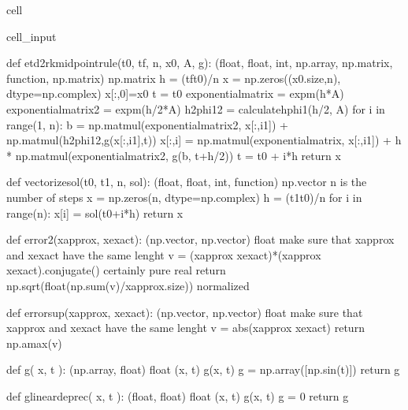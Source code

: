 \documentclass[letterpaper,10pt,english]{jupyterBook}
\begin{document}
\begin{sphinxuseclass}{cell}
\begin{sphinxVerbatimInput}
\begin{sphinxuseclass}{cell_input}
\begin{sphinxVerbatim}[commandchars=\\\{\}]
def etd2rk\PYGZus{}midpoint\PYGZus{}rule(t0, tf, n, x0, A, g):
    \PYGZsq{}\PYGZsq{}\PYGZsq{}(float, float, int, np.array, np.matrix, function, np.matrix) \PYGZhy{}\PYGZgt{} np.matrix\PYGZsq{}\PYGZsq{}\PYGZsq{}
    h = (tf\PYGZhy{}t0)/n
    x = np.zeros((x0.size,n), dtype=np.complex\PYGZus{})
    x[:,0]=x0
    t = t0
    exponential\PYGZus{}matrix = expm(\PYGZhy{}h*A)
    exponential\PYGZus{}matrix\PYGZus{}2 = expm(\PYGZhy{}h/2*A)
    h\PYGZus{}2phi1\PYGZus{}2 = calculate\PYGZus{}hphi1(h/2, A)
    for i in range(1, n):
        b = np.matmul(exponential\PYGZus{}matrix\PYGZus{}2, x[:,i\PYGZhy{}1]) + np.matmul(h\PYGZus{}2phi1\PYGZus{}2,g(x[:,i\PYGZhy{}1],t))
        x[:,i] = np.matmul(exponential\PYGZus{}matrix, x[:,i\PYGZhy{}1]) + h * np.matmul(exponential\PYGZus{}matrix\PYGZus{}2, g(b, t+h/2))
        t = t0 + i*h
    return x

def vectorize\PYGZus{}sol(t0, t1, n, sol):
    \PYGZsq{}\PYGZsq{}\PYGZsq{}
    (float, float, int, function) \PYGZhy{}\PYGZgt{} np.vector
    n is the number of steps
    \PYGZsq{}\PYGZsq{}\PYGZsq{}
    x = np.zeros(n, dtype=np.complex\PYGZus{})
    h = (t1\PYGZhy{}t0)/n
    for i in range(n):
        x[i] = sol(t0+i*h)
    return x

def error\PYGZus{}2(x\PYGZus{}approx, x\PYGZus{}exact):
    \PYGZsq{}\PYGZsq{}\PYGZsq{} (np.vector, np.vector) \PYGZhy{}\PYGZgt{} float \PYGZsq{}\PYGZsq{}\PYGZsq{}
    \PYGZsh{}make sure that x\PYGZus{}approx and x\PYGZus{}exact have the same lenght
    v = (x\PYGZus{}approx \PYGZhy{} x\PYGZus{}exact)*(x\PYGZus{}approx \PYGZhy{} x\PYGZus{}exact).conjugate()
    \PYGZsh{}\PYGZca{}certainly pure real
    return np.sqrt(float(np.sum(v)/x\PYGZus{}approx.size)) \PYGZsh{}normalized

def error\PYGZus{}sup(x\PYGZus{}approx, x\PYGZus{}exact):
    \PYGZsq{}\PYGZsq{}\PYGZsq{} (np.vector, np.vector) \PYGZhy{}\PYGZgt{} float \PYGZsq{}\PYGZsq{}\PYGZsq{}
    \PYGZsh{}make sure that x\PYGZus{}approx and x\PYGZus{}exact have the same lenght
    v = abs(x\PYGZus{}approx \PYGZhy{} x\PYGZus{}exact)
    return np.amax(v)

def g( x, t ):
    \PYGZsq{}\PYGZsq{}\PYGZsq{} (np.array, float) \PYGZhy{}\PYGZgt{} float
        (x, t) \PYGZhy{}\PYGZgt{} g(x, t)
    \PYGZsq{}\PYGZsq{}\PYGZsq{}
    g = np.array([np.sin(t)])
    return g

def g\PYGZus{}linear\PYGZus{}deprec( x, t ):
    \PYGZsq{}\PYGZsq{}\PYGZsq{} (float, float) \PYGZhy{}\PYGZgt{} float
        (x, t) \PYGZhy{}\PYGZgt{} g(x, t)
    \PYGZsq{}\PYGZsq{}\PYGZsq{}
    g = 0
    return g


\end{sphinxVerbatim}
\end{sphinxuseclass}
\end{sphinxVerbatimInput}
\end{sphinxuseclass}
\end{document}
